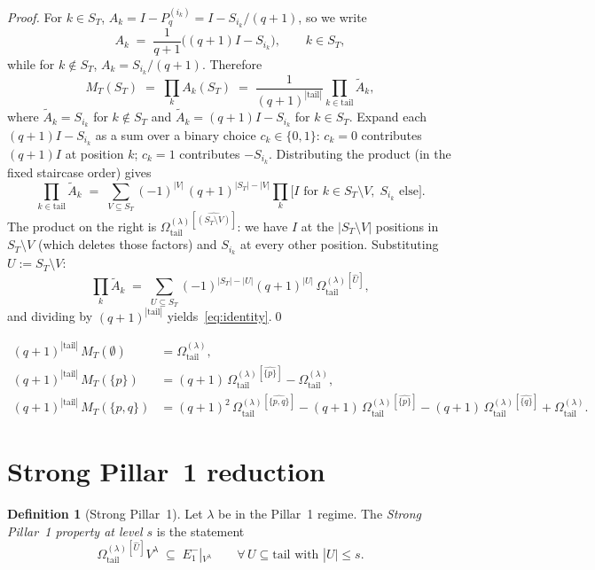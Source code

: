 \documentclass[11pt]{article}
\theoremstyle{definition}
\newtheorem{definition}[theorem]{Definition}
\newcommand{\Vlam}{V^\lambda}
\newcommand{\Om}{\Omega}
\newcommand{\Omtail}{\Om^{(\lambda)}_{\mathrm{tail}}}
\newcommand{\Eminus}[1]{E^-_{#1}}
\begin{document}
\begin{proof}
For $k \in S_T$, $A_k = I - P_q^{(i_k)} = I - S_{i_k}/(q+1)$, so we write
\[
   A_k \;=\; \frac{1}{q+1}\bigl((q+1)I - S_{i_k}\bigr),
   \qquad k \in S_T,
\]
while for $k \notin S_T$, $A_k = S_{i_k}/(q+1)$. Therefore
\[
   M_T(S_T) \;=\; \prod_{k} A_k(S_T) \;=\; \frac{1}{(q+1)^{|\mathrm{tail}|}}
   \prod_{k \in \mathrm{tail}}\widetilde A_k,
\]
where $\widetilde A_k = S_{i_k}$ for $k \notin S_T$ and $\widetilde A_k =
(q+1)I - S_{i_k}$ for $k \in S_T$. Expand each $(q+1)I - S_{i_k}$ as a sum
over a binary choice $c_k \in \{0,1\}$: $c_k = 0$ contributes $(q+1)I$ at
position $k$; $c_k = 1$ contributes $-S_{i_k}$. Distributing the product (in
the fixed staircase order) gives
\[
   \prod_{k \in \mathrm{tail}}\widetilde A_k \;=\;
   \sum_{V \subseteq S_T} (-1)^{|V|}\,(q+1)^{|S_T|-|V|}
   \prod_{k}\bigl[I \text{ for } k \in S_T\setminus V,\; S_{i_k}\text{ else}\bigr].
\]
The product on the right is $\Omtail^{[\widehat{(S_T \setminus V)}]}$: we have
$I$ at the $|S_T \setminus V|$ positions in $S_T \setminus V$ (which deletes
those factors) and $S_{i_k}$ at every other position. Substituting
$U := S_T \setminus V$:
\[
   \prod_{k}\widetilde A_k \;=\; \sum_{U \subseteq S_T} (-1)^{|S_T|-|U|}
   (q+1)^{|U|}\, \Omtail^{[\widehat U]},
\]
and dividing by $(q+1)^{|\mathrm{tail}|}$ yields~\eqref{eq:identity}.\qed
\end{proof}

\begin{example}[$|S_T| = 0, 1, 2$]\label{ex:identity-small}
\begin{align*}
   (q+1)^{|\mathrm{tail}|}\, M_T(\emptyset) &= \Omtail,\\
   (q+1)^{|\mathrm{tail}|}\, M_T(\{p\}) &= (q+1)\,\Omtail^{[\widehat{\{p\}}]} - \Omtail,\\
   (q+1)^{|\mathrm{tail}|}\, M_T(\{p,q\}) &=
       (q+1)^2\,\Omtail^{[\widehat{\{p,q\}}]}
       - (q+1)\,\Omtail^{[\widehat{\{p\}}]}
       - (q+1)\,\Omtail^{[\widehat{\{q\}}]}
       + \Omtail.
\end{align*}
\end{example}

\section{Strong Pillar~1 reduction}\label{sec:reduction}

\begin{definition}[Strong Pillar~1]\label{def:strong-pillar1}
Let $\lambda$ be in the Pillar~1 regime. The \emph{Strong Pillar~1
property at level $s$} is the statement
\begin{equation}\label{eq:strong-pillar1}
   \Omtail^{[\widehat U]} \Vlam \;\subseteq\;
   \Eminus 1|_{\Vlam}
   \qquad \forall\, U \subseteq \mathrm{tail} \text{ with } |U| \le s.
\end{equation}
\end{definition}
\end{document}
